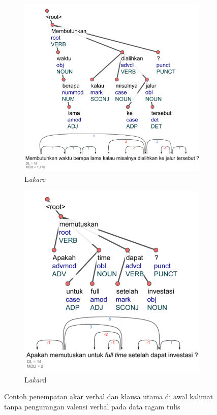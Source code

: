 \begin{figure}
\centering

\begin{subfigure}{.55\linewidth}
  \centering
  \includegraphics[width=1\linewidth] {pics/ls4820.jpg} 
	\caption{L\textit{akar}c}
	\label{fig:ls4820} 
\end{subfigure}
%
\begin{subfigure}{.42\linewidth}
  \centering
  \includegraphics[width=1\linewidth]{pics/ls1435.jpg} 
	\caption{L\textit{akar}d}
	\label{fig:ls1435} 
\end{subfigure}
\caption{Contoh penempatan akar verbal dan klausa utama di awal kalimat tanpa pengurangan valensi verbal pada data ragam tulis}
\label{fig:rootvalensi}
\end{figure}

